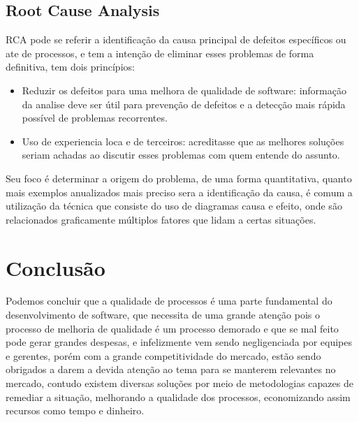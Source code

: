 \documentclass[12pt]{article}
\begin{document}
\subsection{Root Cause Analysis}
RCA pode se referir a identificação da causa principal de defeitos específicos ou ate de processos, e tem a intenção de eliminar esses problemas de forma definitiva, tem dois princípios:
\begin{itemize}
    \item Reduzir os defeitos para uma melhora de qualidade de software: informação da analise deve ser útil para prevenção de defeitos e a detecção mais rápida possível de problemas recorrentes.
    \item Uso de experiencia loca e de terceiros: acreditasse que as melhores soluções seriam achadas ao discutir esses problemas com quem entende do assunto.
\end{itemize}
Seu foco é determinar a origem do problema, de uma forma quantitativa, quanto mais exemplos anualizados mais preciso sera a identificação da causa, é comum a utilização da técnica que consiste do uso de diagramas causa e efeito, onde são relacionados graficamente múltiplos fatores que lidam a certas situações.


\section{Conclusão}
Podemos concluir que a qualidade de processos é uma parte fundamental do desenvolvimento de software, que necessita de uma grande atenção pois o processo de melhoria de qualidade é um processo demorado e que se mal feito pode gerar grandes despesas, e infelizmente vem sendo negligenciada por equipes e gerentes, porém com a grande competitividade do mercado, estão sendo obrigados a darem a devida atenção ao tema para se manterem relevantes no mercado, contudo existem diversas soluções por meio de metodologias capazes de remediar a situação, melhorando a qualidade dos processos, economizando assim recursos como tempo e dinheiro.




\end{document}
